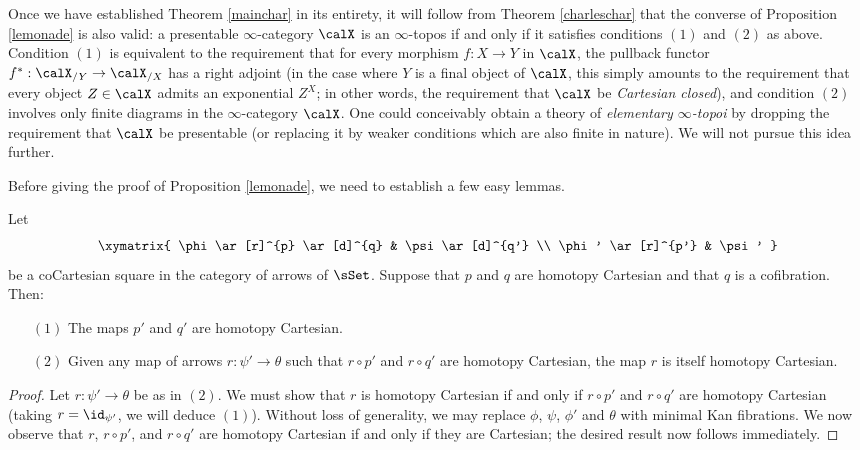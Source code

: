 \begin{remark}
Once we have established Theorem \ref{mainchar} in its entirety, it will follow from Theorem \ref{charleschar} that the converse of Proposition \ref{lemonade} is also valid: a presentable $\infty$-category $\calX$ is an $\infty$-topos if and only if it satisfies conditions $(1)$ and $(2)$ as above. Condition $(1)$ is equivalent to the requirement that
for every morphism $f: X \rightarrow Y$ in $\calX$, the pullback functor $f^{\ast}: \calX_{/Y} \rightarrow \calX_{/X}$ has a right adjoint (in the case where $Y$ is a final object of $\calX$, this simply amounts to the requirement that every object $Z \in \calX$ admits an exponential
$Z^X$; in other words, the requirement that $\calX$ be {\it Cartesian closed}), and condition $(2)$ involves only finite diagrams in the $\infty$-category $\calX$. One could conceivably obtain a theory of {\em elementary $\infty$-topoi} by dropping the requirement that $\calX$ be presentable (or replacing it by weaker conditions which are also finite in nature). We will not pursue this idea further.
\end{remark}

Before giving the proof of Proposition \ref{lemonade}, we need to establish a few easy lemmas.

\begin{lemma}\label{stugart}
Let 
$$ \xymatrix{ \phi \ar[r]^{p} \ar[d]^{q} & \psi \ar[d]^{q'} \\
\phi' \ar[r]^{p'} & \psi' }$$
be a coCartesian square in the category of arrows of $\sSet$. Suppose that
$p$ and $q$ are homotopy Cartesian and that $q$ is a cofibration. Then:
\begin{itemize}
\item[$(1)$] The maps $p'$ and $q'$ are homotopy Cartesian.
\item[$(2)$] Given any map of arrows $r: \psi' \rightarrow \theta$ such that
$r \circ p'$ and $r \circ q'$ are homotopy Cartesian, the map $r$ is itself homotopy Cartesian.
\end{itemize}
\end{lemma}

\begin{proof}
Let $r: \psi' \rightarrow \theta$ be as in $(2)$. We must show that $r$ is homotopy Cartesian if and only if $r \circ p'$ and $r \circ q'$ are homotopy Cartesian (taking $r = \id_{\psi'}$, we will deduce $(1)$). Without loss of generality, we may replace $\phi$, $\psi$, $\phi'$ and $\theta$ with minimal Kan fibrations. We now observe that $r$, $r \circ p'$, and $r \circ q'$ are homotopy Cartesian if and only if they are Cartesian; the desired result now follows immediately.
\end{proof}

